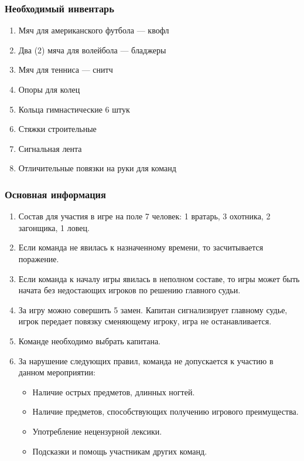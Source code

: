 
\subsubsection*{Необходимый инвентарь}
\begin{enumerate}
\item Мяч для американского футбола --- квофл
\item Два (2) мяча для волейбола --- бладжеры
\item Мяч для тенниса --- снитч
\item Опоры для колец
\item Кольца гимнастические 6 штук
\item Стяжки строительные
\item Сигнальная лента
\item Отличительные повязки на руки для команд
\end{enumerate}

\subsubsection*{Основная информация}
\begin{enumerate}
\item Состав для участия в игре на поле 7 человек: 1 вратарь, 3 охотника, 2 загонщика, 1 ловец.
\item Если команда не явилась к назначенному времени, то засчитывается поражение.
\item Если команда к началу игры явилась в неполном составе, то игры может быть начата без недостающих игроков по решению главного судьи.
\item За игру можно совершить 5 замен. Капитан сигнализирует главному судье, игрок передает повязку сменяющему игроку, игра не останавливается.
\item Команде необходимо выбрать капитана.
\item За нарушение следующих правил, команда не допускается к участию в данном мероприятии:
	\begin{itemize}
	\item Наличие острых предметов, длинных ногтей.
	\item Наличие предметов, способствующих получению игрового преимущества.
	\item Употребление нецензурной лексики.
	\item Подсказки и помощь участникам других команд.
	\end{itemize}
\end{enumerate}


